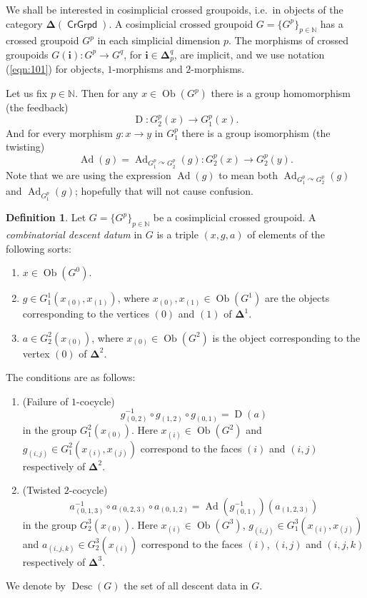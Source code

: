 \documentclass[a4paper,10pt]{amsart}
\theoremstyle{definition}
\newtheorem{dfn}[equation]{Definition}
\numberwithin{equation}{section}
\newcommand{\opn}{\operatorname}
\newcommand{\cat}[1]{\operatorname{\mathsf{#1}}}
\newcommand{\rmitem}[1]{\item[\text{\textup{(#1)}}]}
\newcommand{\mbb}[1]{\mathbb{#1}}
\newcommand{\bsym}[1]{\boldsymbol{#1}}
\newcommand{\N}{\mbb{N}}
\begin{document}
We shall be interested in cosimplicial crossed groupoids, i.e.\ in objects of
the category $\bsym{\Delta}(\cat{CrGrpd})$. A cosimplicial crossed groupoid 
$G = \{ G^p \}_{p \in \mbb{N}}$
has a crossed groupoid $G^p$ in each simplicial dimension $p$. 
The morphisms of crossed groupoids $G(\bsym{i}) : G^p \to G^q$, 
for $\bsym{i} \in \bsym{\Delta}_p^q$, are implicit, and we use notation
(\ref{eqn:101}) for objects, $1$-morphisms and $2$-morphisms.

Let us fix $p \in \N$. Then for any 
$x \in \opn{Ob}(G^p)$ there is a group homomorphism  (the feedback)
\[ \opn{D} : G^p_2(x) \to  G^p_1(x) . \]
And for every morphism $g : x \to y$ in $G_1^p$ there is a group
isomorphism (the twisting)
\[ \opn{Ad}(g) = 
\opn{Ad}_{G^p_1 \curvearrowright G^p_{2}}(g) :
G^p_2(x) \to G^p_2(y) . \]
Note that we are using the expression $\opn{Ad}(g)$ to mean both 
$\opn{Ad}_{G^p_1 \curvearrowright G^p_{2}}(g)$
and 
$\opn{Ad}_{G^p_1}(g)$; hopefully that will not cause confusion.

\begin{dfn} \label{dfn:101}
Let $G = \{ G^p \}_{p \in \mbb{N}}$ be a cosimplicial
crossed groupoid. A {\em combinatorial descent datum} in $G$
is a triple $(x, g, a)$ of elements of the following sorts:
\begin{enumerate}
\rmitem{0}  $x \in \opn{Ob}(G^0)$. 

\rmitem{1} $g \in G^1_1(x_{(0)}, x_{(1)})$, where 
$x_{(0)}, x_{(1)} \in \opn{Ob}(G^1)$ are the objects corresponding
to the vertices $(0)$ and $(1)$ of $\bsym{\Delta}^1$.

\rmitem{2} $a \in G^2_2(x_{(0)})$, where 
$x_{(0)} \in \opn{Ob}(G^2)$ is the object corresponding
to the vertex $(0)$ of $\bsym{\Delta}^2$.
\end{enumerate}

The conditions are as follows:
\begin{enumerate}
\rmitem{i} (Failure of $1$-cocycle) 
\[ g_{(0, 2)}^{-1} \circ g_{(1, 2)} \circ g_{(0, 1)} = \opn{D}(a) \]
in the group $G^2_1(x_{(0)})$.
Here $x_{(i)} \in \opn{Ob}(G^2)$ 
and $g_{(i, j)} \in G^2_1(x_{(i)}, x_{(j)})$ 
correspond to the faces $(i)$ and $(i, j)$ respectively of $\bsym{\Delta}^2$.

\rmitem{ii} (Twisted $2$-cocycle) 
\[ a_{(0, 1, 3)}^{-1} \circ a_{(0, 2, 3)} \circ 
a_{(0, 1, 2)} = 
\opn{Ad}(g_{(0, 1)}^{-1})(a_{(1, 2, 3)}) \]
in the group
$G^3_2(x_{(0)})$.
Here $x_{(i)} \in \opn{Ob}(G^3)$, 
$g_{(i, j)} \in G^3_1(x_{(i)}, x_{(j)})$ and
$a_{(i, j, k)} \in G^3_2(x_{(i)})$
correspond to the faces $(i)$,  $(i, j)$ and $(i, j, k)$ respectively of
$\bsym{\Delta}^3$.
\end{enumerate}

We denote by $\opn{Desc}(G)$ the set of all
descent data in $G$. 
\end{dfn}
\end{document}

